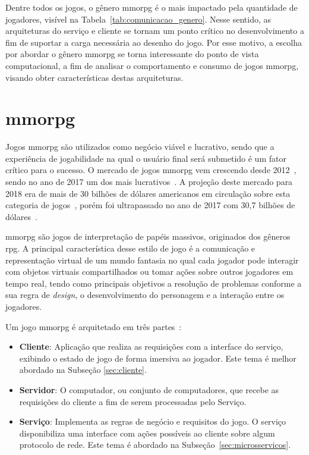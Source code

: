 Dentre todos os jogos, o gênero \ac{mmorpg} é o mais impactado pela quantidade de jogadores\cite{mmo_analytic}, visível na Tabela~\ref{tab:comunicacao_genero}.
%
Nesse sentido, as arquiteturas do serviço e cliente se tornam um ponto crítico no desenvolvimento a fim de suportar a carga necessária ao desenho do jogo.
%
Por esse motivo, a escolha por abordar o gênero \ac{mmorpg} se torna interessante do ponto de vista computacional, a fim de analisar o comportamento e consumo de jogos \ac{mmorpg}, visando obter características destas arquiteturas.



\section{\ac{mmorpg}}
\label{sec:mmorpg}



Jogos \ac{mmorpg} são utilizados como negócio viável e lucrativo, sendo que a experiência de jogabilidade na qual o usuário final será submetido é um fator crítico para o sucesso.
%
O mercado de jogos \ac{mmorpg} vem crescendo desde 2012~\cite{new_york_times}, sendo no ano de 2017 um dos mais lucrativos~\cite{statista_2018_mmo}.
%
A projeção deste mercado para 2018 era de mais de 30 bilhões de dólares americanos em circulação sobre esta categoria de jogos~\cite{statista_2018}, porém foi ultrapassado no ano de 2017 com 30,7 bilhões de dólares~\cite{statista_2018_mmo}.



\ac{mmorpg} são jogos de interpretação de papéis massivos, originados dos gêneros \ac{rpg}.
%
A principal característica desse estilo de jogo é a comunicação e representação virtual de um mundo fantasia no qual cada jogador pode interagir com objetos virtuais compartilhados ou tomar ações sobre outros jogadores em tempo real, tendo como principais objetivos a resolução de problemas conforme a sua regra de \textit{design}, o desenvolvimento do personagem e a interação entre os jogadores\cite{video_game_technologies}.



Um jogo \ac{mmorpg} é arquitetado em três partes~\cite{mmo_analytic}:
\begin{itemize}
  \item \textbf{Cliente}: Aplicação que realiza as requisições com a interface do serviço, exibindo o estado de jogo de forma imersiva ao jogador. Este tema é melhor abordado na Subseção \ref{sec:cliente}.
  \item \textbf{Servidor}: O computador, ou conjunto de computadores, que recebe as requisições do cliente a fim de serem processadas pelo Serviço.
  \item \textbf{Serviço}: Implementa as regras de negócio e requisitos do jogo. O serviço disponibiliza uma interface com ações possíveis ao cliente sobre algum protocolo de rede. Este tema é abordado na Subseção~\ref{sec:microsservicos}.
\end{itemize}

